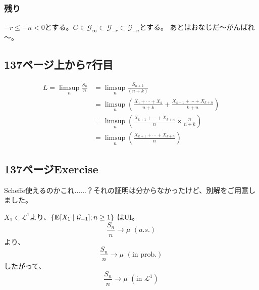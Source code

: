     \subsubsection{残り}
      $-r \leq -n < 0$とする。$G \in \mathcal{G}_{\infty} \subset \mathcal{G}_{-r} \subset \mathcal{G}_{-n}$とする。
      あとはおなじだ～がんばれ～。

  \subsection{137ページ上から7行目}
    \begin{align*}
      L = \limsup_n \frac{S_n}{n} &= \limsup_n \frac{S_{n+k}}{(n+k)} \\
      &= \limsup_n \left(\frac{X_1 + \cdots + X_k}{n+k} + \frac{X_{k+1} + \cdots + X_{k+n}}{k+n}\right)\\
      &= \limsup_n \left(\frac{X_{k+1} + \cdots + X_{k+n}}{n} \times \frac{n}{n+k}\right)\\
      &= \limsup_n \left(\frac{X_{k+1} + \cdots + X_{k+n}}{n} \right)
    \end{align*}

  \subsection{137ページExercise}
    Scheffe使えるのかこれ......？それの証明は分からなかったけど、別解をご用意しました。

    $X_1 \in \mathcal{L}^1$より、$\{{\mathbf{E}}[X_1 \mid \mathcal{G}_{-1}] ; n \ge 1\}$
    はUI。
    \[\frac{S_n}{n} \rightarrow \mu \,\,(a.s.)\]
    より、
    \[\frac{S_n}{n} \rightarrow \mu \,\,(\text{in prob.})\]
     したがって、
     \[\frac{S_n}{n} \rightarrow \mu \,\,(\text{in }\mathcal{L}^1)\]
